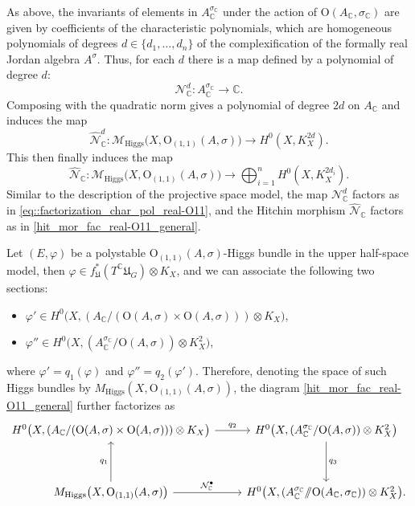 \documentclass[oneside,11pt]{amsart}
\theoremstyle{definition}
\theoremstyle{remark}
\numberwithin{thm}{section}
\numberwithin{equation}{section}
\begin{document}
As above, the invariants of elements in $A_{\mathbb{C}}^{\sigma_{\mathbb{C}}}$ under the action of $\mathrm{O}(A_{\mathbb{C}},\sigma_{\mathbb{C}})$ are given by coefficients of the characteristic polynomials, which are homogeneous polynomials of degrees $d\in\{d_1,\dots,d_n\}$ of the complexification of the formally real Jordan algebra $A^\sigma$. Thus, for each $d$ there is a map defined by a polynomial of degree $d$:
\[
\mathcal N_{\mathbb{C}}^{d}:A_{\mathbb{C}}^{\sigma_{\mathbb{C}}}\longrightarrow\mathbb{C}.
\]
Composing with the quadratic norm gives a polynomial of degree $2d$ on $A_{\mathbb{C}}$ and induces the map
\[
\hat{\mathcal N}_{\mathbb{C}}^{d}: \mathcal M_{\mathrm{Higgs}}\bigl(X,\mathrm{O}_{(1,1)}(A,\sigma)\bigr)
\longrightarrow H^0(X,K_X^{2d}).
\]
This then finally induces the map
\[
\hat{\mathcal N}_{\mathbb{C}}: \mathcal M_{\mathrm{Higgs}}\bigl(X,\mathrm{O}_{(1,1)}(A,\sigma)\bigr) \longrightarrow\bigoplus_{i=1}^{n}H^0(X,K_X^{2d_i}).
\]
Similar to the description of the projective space model, the map $\mathcal N_{\mathbb{C}}^{d}$ factors as in
\eqref{eq::factorization_char_pol_real-O11}, and the Hitchin morphism $\hat{\mathcal N}_{\mathbb{C}}$ factors as in
\eqref{hit_mor_fac_real-O11_general}.

Let $(E,\varphi)$ be a polystable $\mathrm{O}_{(1,1)}(A,\sigma)$-Higgs bundle in the upper half-space model, then $\varphi\in f_{\mathfrak U}^{*}(T^{\mathbb{C}}\mathfrak U_G)\otimes K_X$, and we can associate the following two sections:
\begin{itemize}
\item $\varphi'\in H^0\bigl(X,(A_{\mathbb{C}}/(\mathrm{O}(A,\sigma)\times\mathrm{O}(A,\sigma)))\otimes K_X\bigr)$,
\item $\varphi''\in H^0\bigl(X,(A_{\mathbb{C}}^{\sigma_{\mathbb{C}}}/\mathrm{O}(A,\sigma))\otimes K_X^2\bigr)$,
\end{itemize}
where $\varphi'=q_1(\varphi)$ and $\varphi''=q_2(\varphi')$. Therefore, denoting the space of such Higgs bundles by
$M_{\mathrm{Higgs}}(X,\mathrm{O}_{(1,1)}(A,\sigma))$, the diagram \eqref{hit_mor_fac_real-O11_general} further factorizes as
\begin{equation}
\begin{tikzcd}
H^0\bigl(X,(A_{\mathbb{C}}/
(\mathrm{O}(A,\sigma)\times\mathrm{O}(A,\sigma)))\otimes K_X\bigr)
\arrow[r,"q_2"]
&
H^0\bigl(X,(A_{\mathbb{C}}^{\sigma_{\mathbb{C}}}/
\mathrm{O}(A,\sigma))\otimes K_X^2\bigr)
\arrow[dd,"q_3"]
\\
\\
M_{\mathrm{Higgs}}\bigl(X,\mathrm{O}_{(1,1)}(A,\sigma)\bigr)
\arrow[uu,"q_1"]
\arrow[r,"\mathcal N_{\mathbb{C}}^{\bullet}"]
&
H^0\bigl(X,
(A_{\mathbb{C}}^{\sigma_{\mathbb{C}}}/\!\!/
\mathrm{O}(A_{\mathbb{C}},\sigma_{\mathbb{C}}))\otimes K_X^2
\bigr).
\end{tikzcd}
\end{equation}
\end{document}
